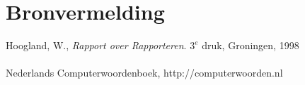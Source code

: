 \chapter{Bronvermelding}

Hoogland, W., \emph{Rapport over Rapporteren}. $3^e$ druk, Groningen, 1998 \\
\\
Nederlands Computerwoordenboek, http://computerwoorden.nl
